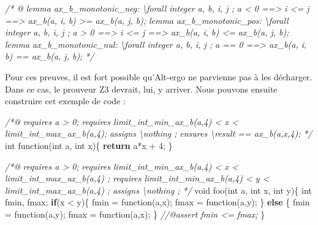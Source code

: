 \documentclass[12pt,francais,]{scrbook}
\newenvironment{Shaded}{}{}
\newcommand{\KeywordTok}[1]{\textcolor[rgb]{0.00,0.44,0.13}{\textbf{{#1}}}}
\newcommand{\DataTypeTok}[1]{\textcolor[rgb]{0.56,0.13,0.00}{{#1}}}
\newcommand{\DecValTok}[1]{\textcolor[rgb]{0.25,0.63,0.44}{{#1}}}
\newcommand{\CommentTok}[1]{\textcolor[rgb]{0.38,0.63,0.69}{\textit{{#1}}}}
\newcommand{\NormalTok}[1]{{#1}}
\begin{document}
\begin{footnotesize}\begin{Shaded}
\begin{Highlighting}[]
\CommentTok{/* @}
\CommentTok{  lemma ax_b_monotonic_neg:}
\CommentTok{    \textbackslash{}forall integer a, b, i, j ;}
\CommentTok{      a <  0 ==> i <= j ==> ax_b(a, i, b) >= ax_b(a, j, b);}
\CommentTok{  lemma ax_b_monotonic_pos:}
\CommentTok{    \textbackslash{}forall integer a, b, i, j ;}
\CommentTok{      a >  0 ==> i <= j ==> ax_b(a, i, b) <= ax_b(a, j, b);}
\CommentTok{  lemma ax_b_monotonic_nul:}
\CommentTok{    \textbackslash{}forall integer a, b, i, j ;}
\CommentTok{      a == 0 ==> ax_b(a, i, b) == ax_b(a, j, b);}
\CommentTok{*/}
\end{Highlighting}
\end{Shaded}\end{footnotesize}

Pour ces preuves, il est fort possible qu'Alt-ergo ne parvienne pas à
les décharger. Dans ce cas, le prouveur Z3 devrait, lui, y arriver. Nous
pouvons ensuite construire cet exemple de code :

\begin{footnotesize}\begin{Shaded}
\begin{Highlighting}[]
\CommentTok{/*@}
\CommentTok{  requires a > 0;}
\CommentTok{  requires limit_int_min_ax_b(a,4) < x < limit_int_max_ax_b(a,4);}
\CommentTok{  assigns \textbackslash{}nothing ;}
\CommentTok{  ensures \textbackslash{}result == ax_b(a,x,4);}
\CommentTok{*/}
\DataTypeTok{int} \NormalTok{function(}\DataTypeTok{int} \NormalTok{a, }\DataTypeTok{int} \NormalTok{x)\{}
  \KeywordTok{return} \NormalTok{a*x + }\DecValTok{4}\NormalTok{;}
\NormalTok{\}}

\CommentTok{/*@ }
\CommentTok{  requires a > 0;}
\CommentTok{  requires limit_int_min_ax_b(a,4) < x < limit_int_max_ax_b(a,4) ;}
\CommentTok{  requires limit_int_min_ax_b(a,4) < y < limit_int_max_ax_b(a,4) ;}
\CommentTok{  assigns \textbackslash{}nothing ;}
\CommentTok{*/}
\DataTypeTok{void} \NormalTok{foo(}\DataTypeTok{int} \NormalTok{a, }\DataTypeTok{int} \NormalTok{x, }\DataTypeTok{int} \NormalTok{y)\{}
  \DataTypeTok{int} \NormalTok{fmin, fmax;}
  \KeywordTok{if}\NormalTok{(x < y)\{}
    \NormalTok{fmin = function(a,x);}
    \NormalTok{fmax = function(a,y);}
  \NormalTok{\} }\KeywordTok{else} \NormalTok{\{}
    \NormalTok{fmin = function(a,y);}
    \NormalTok{fmax = function(a,x);}
  \NormalTok{\}}
  \CommentTok{//@assert fmin <= fmax;}
\NormalTok{\}}
\end{Highlighting}
\end{Shaded}\end{footnotesize}
\end{document}
